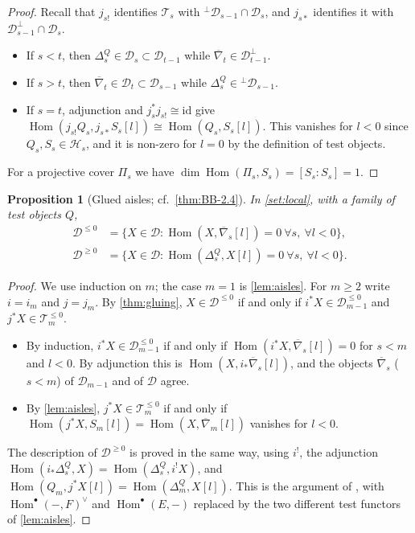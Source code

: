 \documentclass[11pt,reqno]{amsart}
\theoremstyle{plain}
\newtheorem{proposition}[theorem]{Proposition}
\theoremstyle{definition}
\theoremstyle{remark}
\DeclareMathOperator{\Hom}{Hom}
\newcommand{\nablabar}{\overline{\nabla}}
\newcommand{\cD}{\mathcal{D}}
\newcommand{\cH}{\mathcal{H}}
\newcommand{\cT}{\mathcal{T}}
\begin{document}
\begin{proof}
Recall that $j_{s!}$ identifies $\cT_s$ with ${}^\perp\cD_{s-1}\cap\cD_s$, and $j_{s*}$ identifies it with $\cD_{s-1}^\perp\cap\cD_s$.
\begin{itemize}
\item If $s<t$, then $\Delta^Q_s\in\cD_s\subset\cD_{t-1}$ while $\nablabar_t\in\cD_{t-1}^\perp$.
\item If $s>t$, then $\nablabar_t\in\cD_t\subset\cD_{s-1}$ while $\Delta^Q_s\in{}^\perp\cD_{s-1}$.
\item If $s=t$, adjunction and $j_s^*j_{s!}\cong\mathrm{id}$ give $\Hom(j_{s!}Q_s,j_{s*}S_s[l])\cong\Hom(Q_s,S_s[l])$. This vanishes for $l<0$ since $Q_s,S_s\in\cH_s$, and it is non-zero for $l=0$ by the definition of test objects.
\end{itemize}
For a projective cover $\Pi_s$ we have $\dim\Hom(\Pi_s,S_s)=[S_s:S_s]=1$.
\end{proof}

\begin{proposition}[Glued aisles; cf.\ {\cref{thm:BB-2.4}}]\label{prop:aisles}
In \cref{set:local}, with a family of test objects $Q$,
\begin{align*}
\cD^{\le0}&=\{X\in\cD:\Hom(X,\nablabar_s[l])=0\ \forall s,\ \forall l<0\},\\
\cD^{\ge0}&=\{X\in\cD:\Hom(\Delta^Q_s,X[l])=0\ \forall s,\ \forall l<0\}.
\end{align*}
\end{proposition}

\begin{proof}
We use induction on $m$; the case $m=1$ is \cref{lem:aisles}. For $m\ge2$ write $i=i_m$ and $j=j_m$. By \cref{thm:gluing}, $X\in\cD^{\le0}$ if and only if $i^*X\in\cD_{m-1}^{\le0}$ and $j^*X\in\cT_m^{\le0}$.
\begin{itemize}
\item By induction, $i^*X\in\cD_{m-1}^{\le0}$ if and only if $\Hom(i^*X,\nablabar_s[l])=0$ for $s<m$ and $l<0$. By adjunction this is $\Hom(X,i_*\nablabar_s[l])$, and the objects $\nablabar_s$ ($s<m$) of $\cD_{m-1}$ and of $\cD$ agree.
\item By \cref{lem:aisles}, $j^*X\in\cT_m^{\le0}$ if and only if $\Hom(j^*X,S_m[l])=\Hom(X,\nablabar_m[l])$ vanishes for $l<0$.
\end{itemize}
The description of $\cD^{\ge0}$ is proved in the same way, using $i^!$, the adjunction $\Hom(i_*\Delta^Q_s,X)=\Hom(\Delta^Q_s,i^!X)$, and $\Hom(Q_m,j^*X[l])=\Hom(\Delta^Q_m,X[l])$. This is the argument of \cite[Lemma~2.4]{BB26}, with $\Hom^\bullet(-,F)^\vee$ and $\Hom^\bullet(E,-)$ replaced by the two different test functors of \cref{lem:aisles}.
\end{proof}
\end{document}
